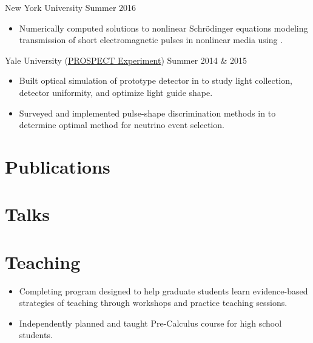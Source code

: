 \documentclass{cultvoucher}
\begin{document}
{New York University}
{Summer 2016}
\begin{itemize}
	\vspace{-0.25em}
	\item Numerically computed solutions to nonlinear Schr\"{o}dinger equations modeling transmission of short electromagnetic pulses in nonlinear media using .
\end{itemize}

{Yale University (\href{http://prospect.yale.edu/}{\small{PROSPECT Experiment}})}
{Summer 2014 \& 2015}
\begin{itemize}
	\vspace{-0.25em}
	\item Built optical simulation of prototype detector in  to study light collection, detector uniformity, and optimize light guide shape.
	\item Surveyed and implemented pulse-shape discrimination methods in  to determine optimal method for neutrino event selection.
\end{itemize}

\section{Publications}

\restoregeometry

\section{Talks}

\section{Teaching}

\begin{itemize}
	\vspace{-0.25em}
	\item Completing program designed to help graduate students learn evidence-based strategies of teaching through workshops and practice teaching sessions.
\end{itemize}

\begin{itemize}
	\vspace{-0.25em}
	\item Independently planned and taught Pre-Calculus course for high school students.
\end{itemize}
\end{document}
